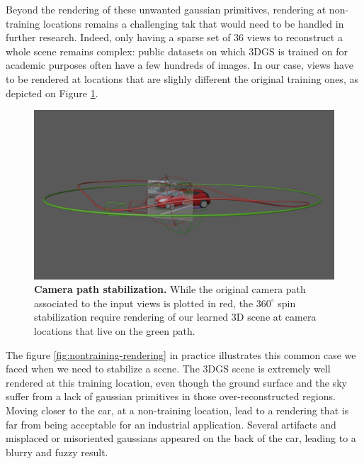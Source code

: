 Beyond the rendering of these unwanted gaussian primitives, rendering at non-training locations remains a challenging tak that would need to be handled in further research. Indeed, only having a sparse set of 36 views to reconstruct a whole scene remains complex: public datasets on which 3D\ac{GS} is trained on for academic purposes often have a few hundreds of images. In our case, views have to be rendered at locations that are slighly different the original training ones, as depicted on Figure \ref{fig:theory-camera-path}. 

\begin{figure}[htb!]
  \center
\includegraphics[width=\linewidth]{images/gaussiansplatting/theory-camera-path.png}
\caption{\textbf{Camera path stabilization.} While the original camera path associated to the input views is plotted in red, the $360^{\circ}$ spin stabilization require rendering of our learned 3D scene at camera locations that live on the green path.}
\label{fig:theory-camera-path}
\end{figure}

The figure \ref{fig:nontraining-rendering} in practice illustrates this common case we faced when we need to stabilize a scene. The 3D\ac{GS} scene is extremely well rendered at this training location, even though the ground surface and the sky suffer from a lack of gaussian primitives in those over-reconstructed regions. Moving closer to the car, at a non-training location, lead to a rendering that is far from being acceptable for an industrial application. Several artifacts and misplaced or misoriented gaussians appeared on the back of the car, leading to a blurry and fuzzy result. 



